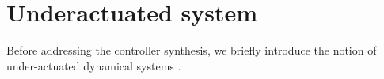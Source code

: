


\section{Underactuated system}
Before addressing the controller synthesis, we briefly introduce the notion of under-actuated dynamical systems \cite{Santina2019,Spong1996,Spong1998,Tedrake2009}. 

